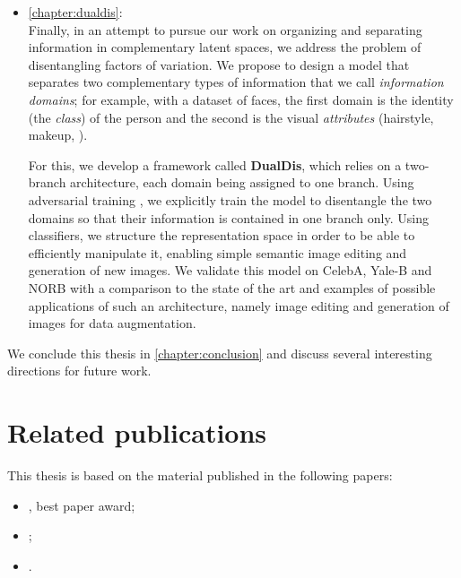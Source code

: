 \begin{itemize}
	\item \autoref{chapter:dualdis}: \\
	Finally, in an attempt to pursue our work on organizing and separating information in complementary latent spaces, we address the problem of disentangling factors of variation.
	We propose to design a model that separates two complementary types of information that we call \textit{information domains}; for example, with a dataset of faces, the first domain is the identity (\ie the \textit{class}) of the person and the second is the visual \textit{attributes} (hairstyle, makeup, \etc).

	For this, we develop a framework called \textbf{DualDis}, which relies on a two-branch architecture, each domain being assigned to one branch. Using adversarial training \citep{Goodfellow2014}, we explicitly train the model to disentangle the two domains so that their information is contained in one branch only. Using classifiers, we structure the representation space in order to be able to efficiently manipulate it, enabling simple semantic image editing and generation of new images. We validate this model on CelebA, Yale-B and NORB with a comparison to the state of the art and examples of possible applications of such an architecture, namely image editing and generation of images for data augmentation.
\end{itemize}

We conclude this thesis in \autoref{chapter:conclusion} and discuss several interesting directions for future work.

\section{Related publications}

This thesis is based on the material published in the following papers:
\begin{itemize}
	\item {}, best paper award;
	\item {};
	\item {}.
\end{itemize}
